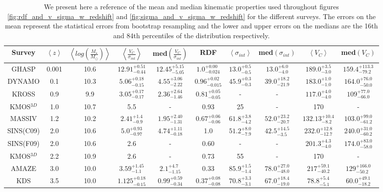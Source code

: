 \documentclass[fleqn,usenatbib]{mn2e}
\begin{document}
\begin{table*}
\centering
\begin{threeparttable}
\caption{We present here a reference of the mean and median kinematic properties used throughout figures \protect\ref{fig:rdf_and_v_sigma_w_redshift} and \protect\ref{fig:sigma_and_v_sigma_w_redshift} for the different surveys.
The errors on the mean represent the statistical errors from bootstrap resampling and the lower and upper errors on the medians are the 16th and 84th percentiles of the distribution respectively.}
\label{tab:evolution_numbers}
\begin{tabular}{c c c c c c c c c c }

 \hline
Survey & $\left< z \right> $ & $\left< log\left(\frac{M_{\star}}{M_{\odot}}\right)\right>$ & $\left< \frac{V_{C}}{\sigma_{int}} \right>$ & med$\left(\frac{V_{C}}{\sigma_{int}}\right)$ & RDF & $ \left< \sigma_{int} \right>$ & med$\left(\sigma_{int}\right)$ & $\left<V_{C}\right>$ & med$\left(V_{C}\right)$  \\
 \hline
 GHASP & 0.001 & 10.6 & $12.91^{+0.51}_{-0.44}$ & $12.45^{+5.15}_{-5.05}$ & $1.0^{+0.00}_{-0.024}$ & $13.0^{+0.5}_{-0.5}$ & $13.0^{+6.0}_{-4.0}$ & $189.0^{+3.5}_{-3.0}$ & $159.4^{+113.3}_{-79.2}$ \\
 DYNAMO & 0.1 & 10.3 & $5.06^{+0.18}_{-0.15}$ & $4.55^{+3.06}_{-2.22}$ & $0.96^{+0.02}_{-0.015}$ & $45.9^{+0.3}_{-0.3}$ & $39.0^{+18.2}_{-21.9}$ & $183.0^{+1.0}_{-1.0}$ & $164.0^{+76.0}_{-50.0}$ \\
 KROSS & 0.9 & 9.9 & $3.05^{+0.17}_{-0.17}$ & $2.36^{+2.64}_{-1.46}$ & $0.81^{+0.05}_{-0.05}$ & - & - & $117.0^{+4.0}_{-4.0}$ & $109^{+77.0}_{-66.0}$ \\
 KMOS$^{3D}$ & 1.0 & 10.7 & 5.5 & - & 0.93 & 25 & - & 170 & - \\
 MASSIV & 1.2 & 10.2 & $2.41^{+1.4}_{-0.9}$ & $1.95^{+2.40}_{-1.31}$ & $0.67^{+0.06}_{-0.06}$ & $61.8^{+3.8}_{-4.2}$ & $52.0^{+23.2}_{-20.7}$ & $132.13^{+10.4}_{-8.2}$ & $103.0^{+99.0}_{-61.2}$ \\
 SINS(C09) & 2.0 & 10.6 & $5.0^{+0.93}_{-0.97}$ & $4.74^{+1.11}_{-0.18}$ & 1.0 & $51.2^{+8.0}_{-7.9}$ & $42.5^{+14.5}_{-3.5}$ & $232.0^{+12.8}_{-12.7}$ & $240.0^{+31.0}_{-60.2}$ \\
 SINS(F09) & 2.0 & 10.6 & 2.6 & - & 0.60 & - & - & $201.3^{+4.3}_{-4.0}$ & $174.0^{+83.0}_{-58.0}$ \\
 KMOS$^{3D}$ & 2.2 & 10.9 & 2.6 & - & 0.73 & 55 & - & 170 & - \\
 AMAZE & 3.0 & 10.0 & $3.59^{+1.45}_{-1.1}$ & $2.1^{+4.7}_{-1.15}$ & 0.33 & $85.9^{+1.5}_{-1.4}$ & $78.0^{+27.0}_{-48.0}$ & $217^{+59.1}_{-40.2}$ & $129^{+166.0}_{-50.2}$ \\
 KDS & 3.5 & 10.0 & $1.125^{+0.18}_{-0.15}$ & $0.99^{+0.59}_{-0.34}$ & $0.37^{+0.08}_{-0.08}$ & $70.8^{+3.3}_{-3.1}$ & $67.0^{+18.4}_{-19.0}$ & $78.8^{+5.4}_{-5.1}$ & $60.0^{+49.1}_{-18.2}$ \\
 \hline
\end{tabular}
  \end{threeparttable}
  \end{table*}
\end{document}
